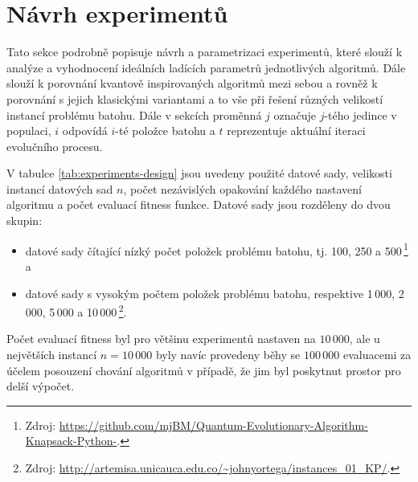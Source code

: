\section{Návrh experimentů}\label{sec:experiments-design}
Tato sekce podrobně popisuje návrh a parametrizaci experimentů, které slouží k analýze a vyhodnocení ideálních ladících parametrů jednotlivých algoritmů. 
Dále slouží k porovnání kvantově inspirovaných algoritmů mezi sebou a rovněž k porovnání s jejich klasickými variantami a to vše při řešení různých velikostí instancí problému batohu. 
Dále v sekcích proměnná $j$ označuje $j$-tého jedince v populaci, $i$ odpovídá $i$-té položce batohu a $t$ reprezentuje aktuální iteraci evolučního procesu. 

V tabulce \ref{tab:experiments-design} jsou uvedeny použité datové sady, velikosti instancí datových sad $n$, počet nezávislých opakování každého nastavení algoritmu a počet evaluací fitness funkce. 
Datové sady jsou rozděleny do dvou skupin:
\begin{itemize}
    \item datové sady čítající nízký počet položek problému batohu, tj. 100, 250 a 500\,\footnote{Zdroj: \url{https://github.com/mjBM/Quantum-Evolutionary-Algorithm-Knapsack-Python-}.} a
    \item datové sady s vysokým počtem položek problému batohu, respektive 1\,000, 2\,000, 5\,000 a 10\,000\,\footnote{Zdroj: \url{http://artemisa.unicauca.edu.co/~johnyortega/instances_01_KP/}.}.
\end{itemize}
Počet evaluací fitness byl pro většinu experimentů nastaven na $10\,000$, ale u největších instancí $n = 10\,000$ byly navíc provedeny běhy se $100\,000$ evaluacemi za účelem posouzení chování algoritmů v případě, že jim byl poskytnut prostor pro delší výpočet.  

